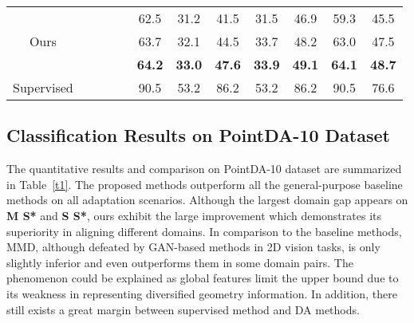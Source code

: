 \documentclass{article}
\begin{document}
\begin{table*}[t]
\begin{center}
{\begin{threeparttable}
\begin{tabular}{ccccc ccccc cc}
\toprule
\multicolumn{1}{c}{ } &{}  &\multicolumn{1}{c}{}  &\multicolumn{1}{c}{} &\multicolumn{1}{c}{} &\multicolumn{1}{c}{62.5} &\multicolumn{1}{c}{31.2} &\multicolumn{1}{c}{41.5}  &\multicolumn{1}{c}{31.5} &\multicolumn{1}{c}{46.9} &\multicolumn{1}{c}{59.3}  &\multicolumn{1}{c}{45.5}\\
\multicolumn{1}{c}{Ours} &{}  &\multicolumn{1}{c}{}  &\multicolumn{1}{c}{} &\multicolumn{1}{c}{} &\multicolumn{1}{c}{63.7} &\multicolumn{1}{c}{32.1} &\multicolumn{1}{c}{44.5}  &\multicolumn{1}{c}{33.7} &\multicolumn{1}{c}{48.2} &\multicolumn{1}{c}{63.0}  &\multicolumn{1}{c}{47.5}\\
\multicolumn{1}{c}{ } &{}  &\multicolumn{1}{c}{}  &\multicolumn{1}{c}{} &\multicolumn{1}{c}{} &\multicolumn{1}{c}{\textbf{64.2}} &\multicolumn{1}{c}{\textbf{33.0}} &\multicolumn{1}{c}{\textbf{47.6}}  &\multicolumn{1}{c}{\textbf{33.9}} &\multicolumn{1}{c}{\textbf{49.1}} &\multicolumn{1}{c}{\textbf{64.1}}  &\multicolumn{1}{c}{\textbf{48.7}}\\
\toprule
\multicolumn{1}{c}{Supervised} &{}  &\multicolumn{1}{c}{}  &\multicolumn{1}{c}{} &\multicolumn{1}{c}{} &\multicolumn{1}{c}{90.5} &\multicolumn{1}{c}{53.2} &\multicolumn{1}{c}{86.2}  &\multicolumn{1}{c}{53.2} &\multicolumn{1}{c}{86.2} &\multicolumn{1}{c}{90.5}  &\multicolumn{1}{c}{76.6}\\
\bottomrule  \end{tabular}
\renewcommand{\labelitemi}{}
\end{threeparttable}
}
\end{center}

\end{table*}

\subsection{Classification Results on PointDA-10 Dataset}

The quantitative results and comparison on PointDA-10 dataset are summarized in Table~\ref{t1}. The proposed methods outperform all the general-purpose baseline methods on all adaptation scenarios. Although the largest domain gap appears on \textbf{M  S*} and \textbf{S  S*}, ours exhibit the large improvement which demonstrates its superiority in aligning different domains. In comparison to the baseline methods, MMD, although defeated by GAN-based methods in 2D vision tasks, is only slightly inferior and even outperforms them in some domain pairs. The phenomenon could be explained as global features limit the upper bound due to its weakness in representing diversified geometry information. In addition, there still exists a great margin between supervised method and DA methods.
\end{document}
